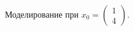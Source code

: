 \documentclass[a5paper, 10pt]{article}
\theoremstyle{definition}
\theoremstyle{plain}
\theoremstyle{remark}
\begin{document}
\begin{figure}[h!]
\caption{Моделирование при $x_0 = \begin{pmatrix} 1 \\ 4 \end{pmatrix}$.}
\end{figure}
\end{document}
